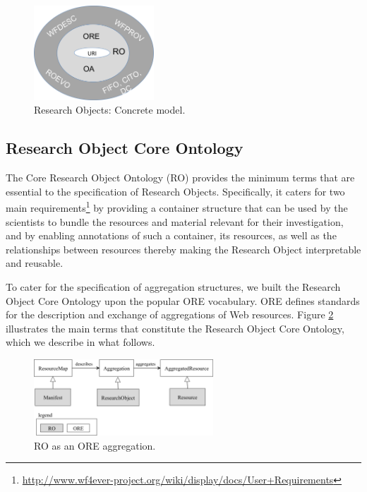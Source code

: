  \begin{figure}[ht]
  \centering
  \includegraphics[width=0.4\textwidth]{Figures/wm_concrete.png}
  \caption{Research Objects: Concrete model.}
  \label{fig:wm_concrete}
\end{figure}

\subsection{Research Object Core Ontology} 
The Core Research Object Ontology (RO) provides the minimum terms that are essential to the specification of Research Objects. Specifically, it caters for two main requirements\footnote{\url{http://www.wf4ever-project.org/wiki/display/docs/User+Requirements}} by providing a container structure that can be used by the scientists to bundle the resources and material relevant for their investigation, and by enabling annotations of such a container, its resources, as well as the relationships between resources thereby making the Research Object interpretable and reusable. 

To cater for the specification of aggregation structures, we built the Research Object Core Ontology upon the popular ORE vocabulary. ORE defines standards for the description and exchange of aggregations of Web resources. 
Figure \ref{fig:ro_ontology} illustrates the main terms that constitute the Research Object Core Ontology, which we describe in what follows.


\begin{figure}[ht]
  \centering
  \includegraphics[width=0.6\textwidth]{Figures/ro_ontology_1.png}
  \caption{RO as an ORE aggregation.}
  \label{fig:ro_ontology}
\end{figure}

